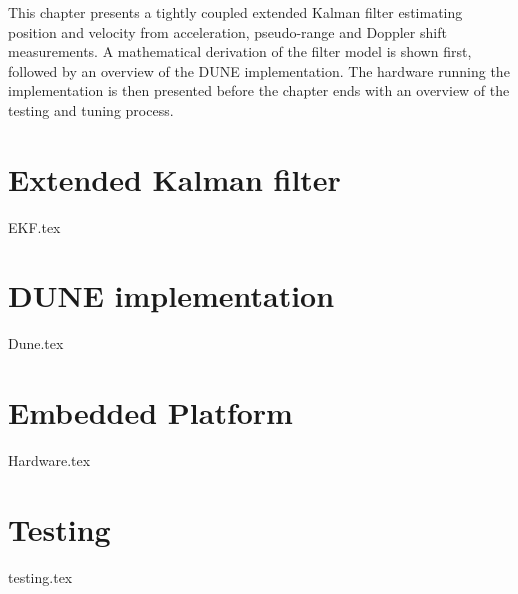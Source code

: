 \graphicspath{{Implementation/}}
\label{ch:implementation}

This chapter presents a tightly coupled extended Kalman filter estimating position and velocity from acceleration, pseudo-range and Doppler shift measurements. A mathematical derivation of the filter model is shown first, followed by an overview of the DUNE implementation. The hardware running the implementation is then presented before the chapter ends with an overview of the testing and tuning process.

\section{Extended Kalman filter}
\label{sec:imp:ekf}
    {EKF.tex}

\section{DUNE implementation}
    {Dune.tex}


\section{Embedded Platform}
    {Hardware.tex}

\section{Testing}
    {testing.tex}
        


%           
        

